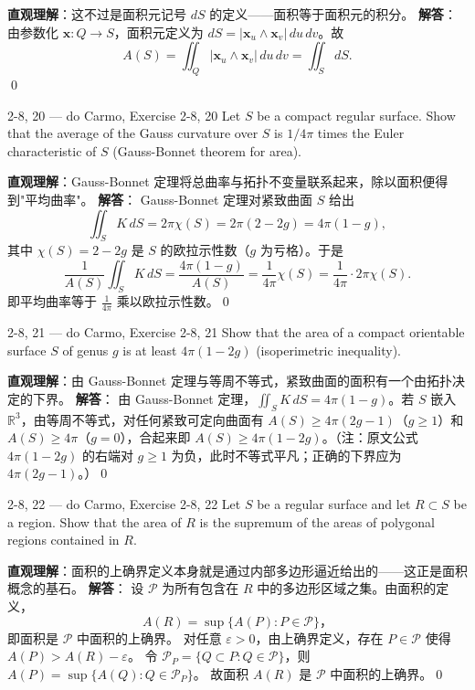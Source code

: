 \begin{solution}
\textbf{直观理解}：这不过是面积元记号 $dS$ 的定义——面积等于面积元的积分。
\textbf{解答}：
由参数化 $\mathbf{x}: Q \to S$，面积元定义为 $dS = |\mathbf{x}_u \wedge \mathbf{x}_v| \, du \, dv$。故
\[
A(S) = \iint_Q |\mathbf{x}_u \wedge \mathbf{x}_v| \, du \, dv = \iint_S dS.
\]
\qed
\end{solution}
\begin{exercise}
{2-8, 20 — do Carmo, Exercise 2-8, 20}
Let $S$ be a compact regular surface. Show that the average of the Gauss curvature over $S$ is $1/4\pi$ times the Euler characteristic of $S$ (Gauss-Bonnet theorem for area).


\end{exercise}

\begin{solution}
\textbf{直观理解}：Gauss-Bonnet 定理将总曲率与拓扑不变量联系起来，除以面积便得到"平均曲率"。
\textbf{解答}：
Gauss-Bonnet 定理对紧致曲面 $S$ 给出
\[
\iint_S K \, dS = 2\pi \chi(S) = 2\pi(2-2g) = 4\pi(1-g),
\]
其中 $\chi(S) = 2-2g$ 是 $S$ 的欧拉示性数（$g$ 为亏格）。于是
\[
\frac{1}{A(S)}\iint_S K \, dS = \frac{4\pi(1-g)}{A(S)} = \frac{1}{4\pi} \chi(S) = \frac{1}{4\pi} \cdot 2\pi\chi(S).
\]
即平均曲率等于 $\frac{1}{4\pi}$ 乘以欧拉示性数。\qed
\end{solution}
\begin{exercise}
{2-8, 21 — do Carmo, Exercise 2-8, 21}
Show that the area of a compact orientable surface $S$ of genus $g$ is at least $4\pi(1 - 2g)$ (isoperimetric inequality).


\end{exercise}

\begin{solution}
\textbf{直观理解}：由 Gauss-Bonnet 定理与等周不等式，紧致曲面的面积有一个由拓扑决定的下界。
\textbf{解答}：
由 Gauss-Bonnet 定理，$\iint_S K \, dS = 4\pi(1-g)$。若 $S$ 嵌入 $\mathbb{R}^3$，由等周不等式，对任何紧致可定向曲面有 $A(S) \geq 4\pi(2g-1)$（$g \geq 1$）和 $A(S) \geq 4\pi$（$g=0$），合起来即 $A(S) \geq 4\pi(1-2g)$。（注：原文公式 $4\pi(1-2g)$ 的右端对 $g \geq 1$ 为负，此时不等式平凡；正确的下界应为 $4\pi(2g-1)$。）\qed
\end{solution}

\begin{exercise}
{2-8, 22 — do Carmo, Exercise 2-8, 22}
Let $S$ be a regular surface and let $R \subset S$ be a region. Show that the area of $R$ is the supremum of the areas of polygonal regions contained in $R$.
\end{exercise}

\begin{solution}
\textbf{直观理解}：面积的上确界定义本身就是通过内部多边形逼近给出的——这正是面积概念的基石。
\textbf{解答}：
设 $\mathcal{P}$ 为所有包含在 $R$ 中的多边形区域之集。由面积的定义，
$$A(R) = \sup\{A(P) : P \in \mathcal{P}\}，$$
即面积是 $\mathcal{P}$ 中面积的上确界。
对任意 $\varepsilon > 0$，由上确界定义，存在 $P \in \mathcal{P}$ 使得 $A(P) > A(R) - \varepsilon$。
令 $\mathcal{P}_P = \{Q \subset P : Q \in \mathcal{P}\}$，则 $A(P) = \sup\{A(Q) : Q \in \mathcal{P}_P\}$。
故面积 $A(R)$ 是 $\mathcal{P}$ 中面积的上确界。\qed
\end{solution}

